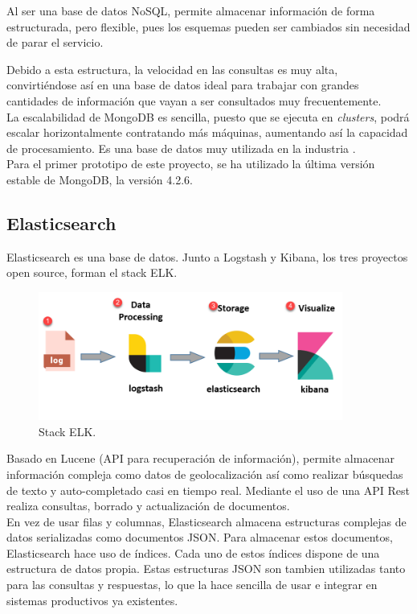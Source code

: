 \documentclass[11pt,a4paper]{book}
\begin{document}
				Al ser una base de datos NoSQL, permite almacenar información de forma estructurada, pero flexible, pues los esquemas pueden ser cambiados sin necesidad de parar el servicio.
				
				Debido a esta estructura, la velocidad en las consultas es muy alta, convirtiéndose así en una base de datos ideal para trabajar con grandes cantidades de información que vayan a ser consultados muy frecuentemente.\\
				
				La escalabilidad de MongoDB es sencilla, puesto que se ejecuta en \textit{clusters}, podrá escalar horizontalmente contratando más máquinas, aumentando así la capacidad de procesamiento. Es una base de datos muy utilizada en la industria \cite{Use_MongoDB}.\\
							
				Para el primer prototipo de este proyecto, se ha utilizado la última versión estable de MongoDB, la versión 4.2.6.
				
			\subsection{Elasticsearch}
				Elasticsearch \cite{elasticseach} es una base de datos. Junto a Logstash y Kibana, los tres proyectos open source, forman el stack ELK. \\
				
				\begin{figure}[H]
					\centering
					\includegraphics[width=10cm, keepaspectratio]{img/ELK_Stack.png}
					\caption{Stack ELK.}
					\label{fig:ELK_Stack}
				\end{figure}
			
				Basado en Lucene (API para recuperación de información), permite almacenar información compleja como datos de geolocalización así como realizar búsquedas de texto y auto-completado casi en tiempo real. Mediante el uso de una API Rest realiza consultas, borrado y actualización de documentos.\\
										
				En vez de usar filas y columnas, Elasticsearch almacena estructuras complejas de datos serializadas como documentos JSON. Para almacenar estos documentos, Elasticsearch hace uso de índices. Cada uno de estos índices dispone de una estructura de datos propia. Estas estructuras JSON son tambien utilizadas tanto para las consultas y respuestas, lo que la hace sencilla de usar e integrar en sistemas productivos ya existentes.\\
								
\end{document}
